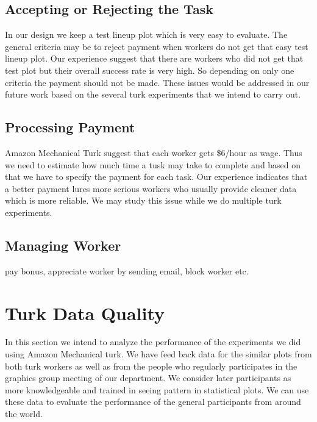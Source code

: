 \documentclass[11pt]{article}
\begin{document}
\subsection{Accepting or Rejecting the Task} In our design we keep a test lineup plot which is very easy to evaluate. The general criteria may be to reject payment when workers do not get that easy test lineup plot. Our experience suggest that there are workers who did not get that test plot but their overall success rate is very high. So depending on only one criteria the payment should not be made. These issues would be addressed in our future work based on the several turk experiments that we intend to carry out.

\subsection{Processing Payment}Amazon Mechanical Turk suggest that each worker gets \$6/hour as wage. Thus we need to estimate how much time a tusk may take to complete and based on that we have to specify the payment for each task. Our experience indicates that a better payment lures more serious workers who usually provide cleaner data which is more reliable. We may study this issue while we do multiple turk experiments.

\subsection{Managing Worker} pay bonus, appreciate worker by sending email, block worker etc.

\section{Turk Data Quality}

In this section we intend to analyze the performance of the experiments we did using Amazon Mechanical turk. We have feed back data for the similar plots from both turk workers as well as from the people who regularly participates in the graphics group meeting of our department. We consider later participants as more knowledgeable and trained in seeing pattern in statistical plots. We can use these data to evaluate the performance of the general participants from around the world.
\end{document}
